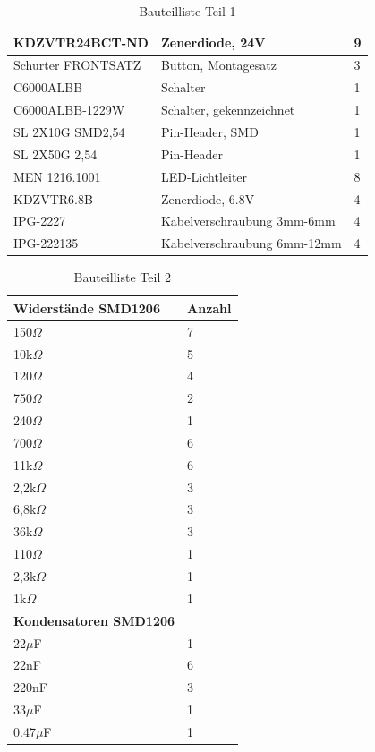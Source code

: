 \begin{table}[H]
{\begin{tabular}{|l|l|l|}
			KDZVTR24BCT-ND & Zenerdiode, 24V & 9 \\ \hline
			Schurter FRONTSATZ & Button, Montagesatz & 3 \\ \hline
			C6000ALBB & Schalter & 1 \\ \hline
			C6000ALBB-1229W & Schalter, gekennzeichnet & 1 \\ \hline
			SL 2X10G SMD2,54 & Pin-Header, SMD & 1 \\ \hline
			SL 2X50G 2,54 & Pin-Header & 1 \\ \hline
			MEN 1216.1001 & LED-Lichtleiter & 8 \\ \hline
			KDZVTR6.8B & Zenerdiode, 6.8V & 4 \\ \hline
			IPG-2227 & Kabelverschraubung 3mm-6mm & 4 \\ \hline
			IPG-222135 & Kabelverschraubung 6mm-12mm & 4 \\ \hline
		\end{tabular}%
	}
	\caption{Bauteilliste Teil 1}
	\label{tab:Verwendeten Bauteile}
\end{table}

\begin{table}[H]
	\centering
	\begin{tabular}{|l|l|}
		\hline
		\textbf{Widerstände SMD1206} & \textbf{Anzahl} \\ \hline
		150$\Omega$ & 7 \\ \hline
		10k$\Omega$ & 5 \\ \hline
		120$\Omega$ & 4 \\ \hline
		750$\Omega$ & 2 \\ \hline
		240$\Omega$ & 1 \\ \hline
		700$\Omega$ & 6 \\ \hline
		11k$\Omega$ & 6 \\ \hline
		2,2k$\Omega$ & 3 \\ \hline
		6,8k$\Omega$ & 3 \\ \hline
		36k$\Omega$ & 3 \\ \hline
		110$\Omega$ & 1 \\ \hline
		2,3k$\Omega$ & 1 \\ \hline
		1k$\Omega$ & 1 \\ \hline
		\textbf{Kondensatoren SMD1206} &  \\ \hline
		22$\mu$F & 1 \\ \hline
		22nF & 6 \\ \hline
		220nF & 3 \\ \hline
		33$\mu$F & 1 \\ \hline
		0.47$\mu$F & 1 \\ \hline
	\end{tabular}
	\caption{Bauteilliste Teil 2}
	\label{tab:Bauteile2}
\end{table}
\newpage
